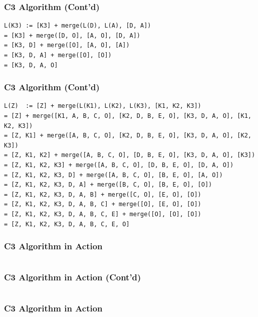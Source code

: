 \documentclass{../py-lecture}
\begin{document}
\begin{frame}[fragile]
	\frametitle{C3 Algorithm (Cont'd)}
	\begin{verbatim}
L(K3) := [K3] + merge(L(D), L(A), [D, A])
= [K3] + merge([D, O], [A, O], [D, A])
= [K3, D] + merge([O], [A, O], [A])
= [K3, D, A] + merge([O], [O])
= [K3, D, A, O]
  \end{verbatim}
\end{frame}

\begin{frame}[fragile]
	\frametitle{C3 Algorithm (Cont'd)}
  \begin{verbatim}
L(Z)  := [Z] + merge(L(K1), L(K2), L(K3), [K1, K2, K3])
= [Z] + merge([K1, A, B, C, O], [K2, D, B, E, O], [K3, D, A, O], [K1, K2, K3])
= [Z, K1] + merge([A, B, C, O], [K2, D, B, E, O], [K3, D, A, O], [K2, K3])
= [Z, K1, K2] + merge([A, B, C, O], [D, B, E, O], [K3, D, A, O], [K3])
= [Z, K1, K2, K3] + merge([A, B, C, O], [D, B, E, O], [D, A, O])
= [Z, K1, K2, K3, D] + merge([A, B, C, O], [B, E, O], [A, O])
= [Z, K1, K2, K3, D, A] + merge([B, C, O], [B, E, O], [O])
= [Z, K1, K2, K3, D, A, B] + merge([C, O], [E, O], [O])
= [Z, K1, K2, K3, D, A, B, C] + merge([O], [E, O], [O])
= [Z, K1, K2, K3, D, A, B, C, E] + merge([O], [O], [O])
= [Z, K1, K2, K3, D, A, B, C, E, O]
  \end{verbatim}
\end{frame}

\begin{frame}[fragile]
	\frametitle{C3 Algorithm in Action}
  \inputminted[bgcolor=Black,fontsize=\scriptsize,lastline=20]{python}{./src/mro.py}
\end{frame}

\begin{frame}[fragile]
	\frametitle{C3 Algorithm in Action (Cont'd)}
  \inputminted[bgcolor=Black,fontsize=\scriptsize,firstline=22,lastline=30]{python}{./src/mro.py}
\end{frame}

\begin{frame}[fragile]
	\frametitle{C3 Algorithm in Action}
  \inputminted[bgcolor=Black,fontsize=\scriptsize,firstline=32]{python}{./src/mro.py}
\end{frame}
\end{document}
